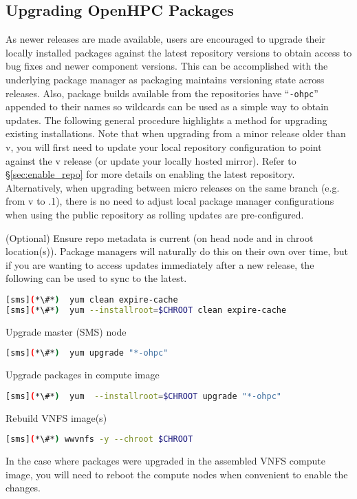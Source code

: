 \subsection{Upgrading OpenHPC Packages}  \label{appendix:upgrade}


As newer \OHPC{} releases are made available, users are encouraged to upgrade
their locally installed packages against the latest repository versions to
obtain access to bug fixes and newer component versions. This can be
accomplished with the underlying package manager as \OHPC{} packaging maintains
versioning state across releases. Also, package builds available from the
\OHPC{} repositories have ``\texttt{-ohpc}'' appended to their names so
wildcards can be used as a simple way to obtain updates. The following general
procedure highlights a method for upgrading existing installations.  Note that
when upgrading from a minor release older than v\OHPCVerTree{}, you will first
need to update your local \OHPC{} repository configuration to point against the
v\OHPCVerTree{} release (or update your locally hosted mirror). Refer to
\S\ref{sec:enable_repo} for more details on enabling the latest
repository. Alternatively, when upgrading between micro releases on the same
branch (e.g. from v\OHPCVerTree{} to \OHPCVerTree{}.1), there is no need to
adjust local package manager configurations when using the public repository as
rolling updates are pre-configured.
 
\begin{enumerate*}
\item (Optional) Ensure repo metadata is current (on head node and in chroot
  location(s)). Package managers will naturally do this on their own over time,
  but if you are wanting to access updates immediately after a new release,
  the following can be used to sync to the latest.

\begin{lstlisting}[language=bash,keywords={}]
[sms](*\#*)  yum clean expire-cache
[sms](*\#*)  yum --installroot=$CHROOT clean expire-cache
\end{lstlisting}

\item Upgrade master (SMS) node

\begin{lstlisting}[language=bash,keywords={}]
[sms](*\#*)  yum upgrade "*-ohpc"
\end{lstlisting}
  
\item Upgrade packages in compute image

\begin{lstlisting}[language=bash,keywords={}]
[sms](*\#*)  yum  --installroot=$CHROOT upgrade "*-ohpc"
\end{lstlisting}
  
\item Rebuild VNFS image(s)

\begin{lstlisting}[language=bash,keywords={}]
[sms](*\#*) wwvnfs -y --chroot $CHROOT
\end{lstlisting}

\end{enumerate*}

\noindent In the case where packages were upgraded in the assembled VNFS compute image,
you will need to reboot the compute nodes when convenient to enable the
changes.
